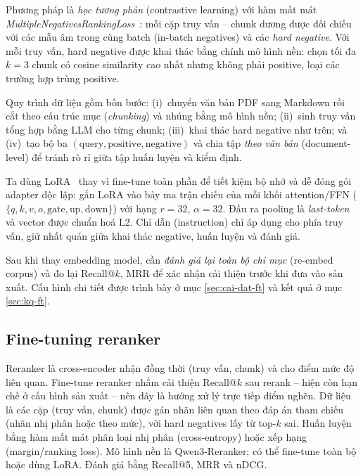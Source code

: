 Phương pháp là \emph{học tương phản} (contrastive learning) với hàm mất mát
\textit{MultipleNegativesRankingLoss}~\cite{henderson2017efficient}: mỗi cặp truy vấn --
chunk dương được đối chiếu với các mẫu âm trong cùng batch (in-batch negatives) và các
\emph{hard negative}. Với mỗi truy vấn, hard negative được khai thác bằng chính mô hình nền:
chọn tối đa $k=3$ chunk có cosine similarity cao nhất nhưng không phải positive, loại các
trường hợp trùng positive.

Quy trình dữ liệu gồm bốn bước: (i)~chuyển văn bản PDF sang Markdown rồi cắt theo cấu trúc
mục (\emph{chunking}) và nhúng bằng mô hình nền; (ii)~sinh truy vấn tổng hợp bằng LLM cho
từng chunk; (iii)~khai thác hard negative như trên; và (iv)~tạo bộ ba
$(\text{query},\text{positive},\text{negative})$ và chia tập \emph{theo văn bản}
(document-level) để tránh rò rỉ giữa tập huấn luyện và kiểm định.

Ta dùng LoRA~\cite{hu2021lora} thay vì fine-tune toàn phần để tiết kiệm bộ nhớ và dễ đóng
gói adapter độc lập: gắn LoRA vào bảy ma trận chiếu của mỗi khối attention/FFN
($\{q,k,v,o,\text{gate},\text{up},\text{down}\}$) với hạng $r=32$, $\alpha=32$. Đầu ra
pooling là \emph{last-token} và vector được chuẩn hoá L2. Chỉ dẫn (instruction) chỉ áp dụng
cho phía truy vấn, giữ nhất quán giữa khai thác negative, huấn luyện và đánh giá.

Sau khi thay embedding model, cần \emph{đánh giá lại toàn bộ chỉ mục} (re-embed corpus) và đo
lại Recall@$k$, MRR để xác nhận cải thiện trước khi đưa vào sản xuất. Cấu hình chi tiết được
trình bày ở mục \ref{sec:cai-dat-ft} và kết quả ở mục \ref{sec:kq-ft}.

\subsection{Fine-tuning reranker}

Reranker là cross-encoder nhận đồng thời (truy vấn, chunk) và cho điểm mức độ liên quan.
Fine-tune reranker nhằm cải thiện Recall@$k$ sau rerank -- hiện còn hạn chế ở cấu hình sản
xuất -- nên đây là hướng xử lý trực tiếp điểm nghẽn. Dữ liệu là các cặp (truy vấn, chunk)
được gán nhãn liên quan theo đáp án tham chiếu (nhãn nhị phân hoặc theo mức), với hard
negatives lấy từ top-$k$ sai. Huấn luyện bằng hàm mất mát phân loại nhị phân (cross-entropy)
hoặc xếp hạng (margin/ranking loss). Mô hình nền là Qwen3-Reranker; có thể fine-tune toàn bộ
hoặc dùng LoRA. Đánh giá bằng Recall@5, MRR và nDCG.

